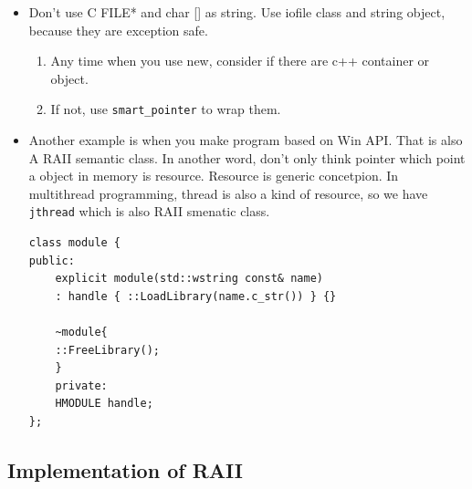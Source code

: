 \documentclass[a4paper,11pt,twoside]{book}
\begin{document}
\begin{itemize}
	\item Don't use C FILE* and char [] as string. Use iofile class and string object, because they are exception safe.
	\begin{enumerate}
		\item Any time when you use new, consider if there are c++ container or object.
		\item If not, use \texttt{smart\_pointer} to wrap them.
	\end{enumerate}
	
\item Another example is when you make program based on Win API. That is also A RAII semantic class. In another word, don't only think pointer which point a object in memory is resource. Resource is generic concetpion. In multithread programming, thread is also a kind of resource, so we have \texttt{jthread} which is also RAII smenatic class.
\begin{lstlisting}[numbers=none]
class module {
public:
	explicit module(std::wstring const& name)
	: handle { ::LoadLibrary(name.c_str()) } {}
	
	~module{
	::FreeLibrary();
	}
	private:
	HMODULE handle;
};
	\end{lstlisting}
\end{itemize}

\subsection{Implementation of RAII}
\end{document}
